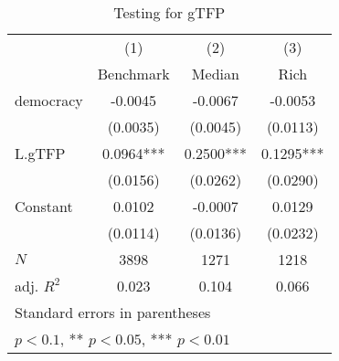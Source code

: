 \begin{table}[htbp]\centering
\def\sym#1{\ifmmode^{#1}\else\(^{#1}\)\fi}
\caption{Testing for gTFP \label{tab:regression8}}
\begin{tabular}{l*{3}{c}}
\hline\hline
            &\multicolumn{1}{c}{(1)}&\multicolumn{1}{c}{(2)}&\multicolumn{1}{c}{(3)}\\
            &\multicolumn{1}{c}{Benchmark}&\multicolumn{1}{c}{Median}&\multicolumn{1}{c}{Rich}\\
\hline
democracy   &     -0.0045   &     -0.0067   &     -0.0053   \\
            &    (0.0035)   &    (0.0045)   &    (0.0113)   \\
[1em]
L.gTFP      &      0.0964***&      0.2500***&      0.1295***\\
            &    (0.0156)   &    (0.0262)   &    (0.0290)   \\
[1em]
Constant    &      0.0102   &     -0.0007   &      0.0129   \\
            &    (0.0114)   &    (0.0136)   &    (0.0232)   \\
\hline
\(N\)       &        3898   &        1271   &        1218   \\
adj. \(R^{2}\)&       0.023   &       0.104   &       0.066   \\
\hline\hline
\multicolumn{4}{l}{\footnotesize Standard errors in parentheses}\\
\multicolumn{4}{l}{\footnotesize * \(p<0.1\), ** \(p<0.05\), *** \(p<0.01\)}\\
\end{tabular}
\end{table}
